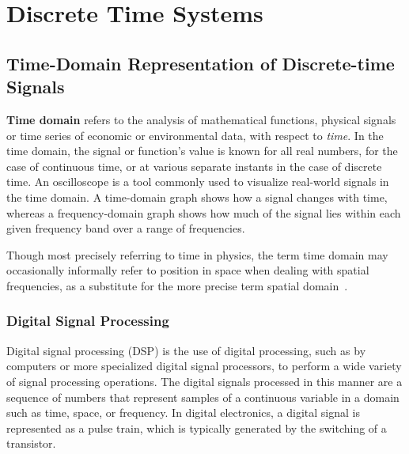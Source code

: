 \documentclass[\documentfontsize, twocolumn]{\classname}
\begin{document}

\setstretch{\spacingvalue}
\setlength{\emergencystretch}{0pt}
\hfuzz=0pt
\setlength{\headsep}{\headsepvalue}
\setlength{\footskip}{\footskipvalue}
\setlength{\marginparsep}{\marginparsepvalue}
\setlength{\marginparwidth}{\marginparwidthvalue}

\tableofcontents

%

\part{Discrete Time Systems}

\chapter{Time-Domain Representation of Discrete-time Signals}

\textbf{Time domain} refers to the analysis of mathematical functions, physical signals or time series of economic or environmental data, with respect to \emph{time}.
In the time domain, the signal or function's value is known for all real numbers, for the case of continuous time, or at various separate instants in the case of discrete time. 
An oscilloscope is a tool commonly used to visualize real-world signals in the time domain. A time-domain graph shows how a signal changes with time, whereas a fre\-quen\-cy-do\-ma\-in graph shows how much of the signal lies within each given frequency band over a range of frequencies.

Though most precisely referring to time in physics, the term time domain may occasionally informally refer to position in space when dealing with spatial frequencies, as a substitute for the more precise term spatial domain~\cite{bib:wikiTimeDomain}.

\section{Digital Signal Processing}
Digital signal processing (DSP) is the use of digital processing, such as by computers or more specialized digital signal processors, to perform a wide variety of signal processing operations.
The digital signals processed in this manner are a sequence of numbers that represent samples of a continuous variable in a domain such as time, space, or frequency.
In digital electronics, a digital signal is represented as a pulse train, which is typically generated by the switching of a transistor.
\end{document}
